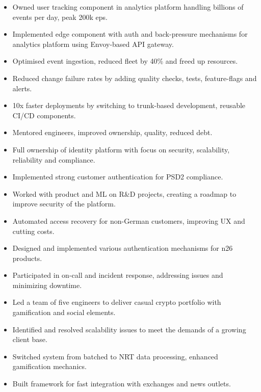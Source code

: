 \documentclass[a4paper,10pt]{article}
\begin{document}
    \begin{itemize}
        \item Owned user tracking component in analytics platform handling billions of events per day, peak 200k eps.
        \item Implemented edge component with auth and back-pressure mechanisms for analytics platform using Envoy-based API gateway.
        \item Optimised event ingestion, reduced fleet by 40\% and freed up resources.
        \item Reduced change failure rates by adding quality checks, tests, feature-flags and alerts.
        \item 10x faster deployments by switching to trunk-based development, reusable CI/CD components.
        \item Mentored engineers, improved ownership, quality, reduced debt.
    \end{itemize}

    \begin{itemize}
        \item Full ownership of identity platform with focus on security, scalability, reliability and compliance.
        \item Implemented strong customer authentication for PSD2 compliance.
        \item Worked with product and ML on R\&D projects, creating a roadmap to improve security of the platform.
        \item Automated access recovery for non-German customers, improving UX and cutting costs.
        \item Designed and implemented various authentication mechanisms for n26 products.
        \item Participated in on-call and incident response, addressing issues and minimizing downtime.
    \end{itemize}

    \begin{itemize}
        \item Led a team of five engineers to deliver casual crypto portfolio with gamification and social elements.
        \item Identified and resolved scalability issues to meet the demands of a growing client base.
        \item Switched system from batched to NRT data processing, enhanced gamification mechanics.
        \item Built framework for fast integration with exchanges and news outlets.
    \end{itemize}
\end{document}
